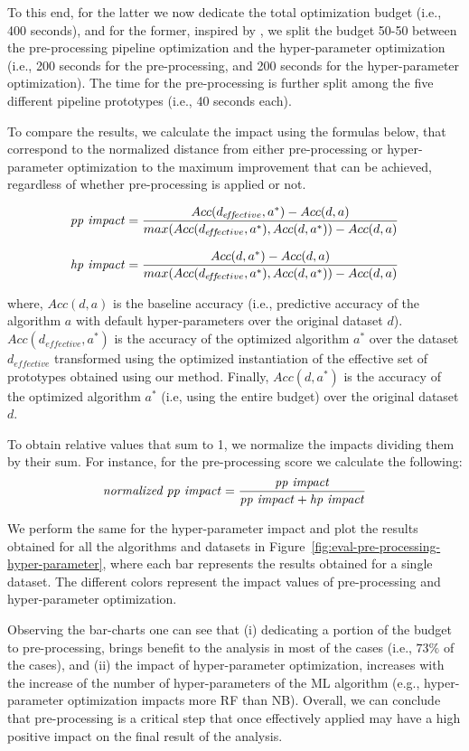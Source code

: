 To this end, for the latter we now dedicate the total optimization budget (i.e., 400 seconds), and for the former, inspired by \cite{Quemy20InfSystems}, we split the budget 50-50 between the pre-processing pipeline optimization and the hyper-parameter optimization (i.e., 200 seconds for the pre-processing, and 200 seconds for the hyper-parameter optimization). The time for the pre-processing is further split among the five different pipeline prototypes (i.e., 40 seconds each).

To compare the results, we calculate the impact using the formulas below, that correspond to the normalized distance from either pre-processing or hyper-parameter optimization to the maximum improvement that can be achieved, regardless of whether pre-processing is applied or not. 

\begin{equation*}
    \text{\textit{pp impact}} = \frac{Acc(d_{e\!f\!f\!ective},a^*) - Acc(d,a)}{max(Acc(d_{e\!f\!f\!ective},a^*),Acc(d,a^*)) - Acc(d,a)}
\end{equation*}

\begin{equation*}
    \text{\textit{hp impact}} = \frac{Acc(d,a^*) - Acc(d,a)}{max(Acc(d_{e\!f\!f\!ective},a^*),Acc(d,a^*)) - Acc(d,a)}
\end{equation*}

where, $Acc(d,a)$ is the baseline accuracy (i.e., predictive accuracy of the algorithm $a$ with default hyper-parameters over the original dataset $d$). $Acc(d_{e\!f\!f\!ective},a^*)$ is the accuracy of the optimized algorithm $a^*$ over the dataset $d_{e\!f\!f\!ective}$ transformed using the optimized instantiation of the effective set of prototypes obtained using our method. Finally,  $Acc(d,a^*)$ is the accuracy of the optimized algorithm $a^*$ (i.e, using the entire budget) over the original dataset $d$.

To obtain relative values that sum to 1, we normalize the impacts dividing them by their sum. For instance, for the pre-processing score we calculate the following:
\begin{equation*}
    \text{\textit{normalized pp impact}} = \frac{\text{\textit{pp impact}}}
    {\text{\textit{pp impact}} + \text{\textit{hp impact}}}
\end{equation*}


We perform the same for the hyper-parameter impact and plot the results obtained for all the algorithms and datasets in Figure~\ref{fig:eval-pre-processing-hyper-parameter}, where each bar represents the results obtained for a single dataset. The different colors represent the impact values of pre-processing and hyper-parameter optimization. 

Observing the bar-charts one can see that (i) dedicating a portion of the budget to pre-processing, brings benefit to the analysis in most of the cases (i.e., $73\%$ of the cases), and (ii) the impact of hyper-parameter optimization, increases with the increase of the number of hyper-parameters of the ML algorithm (e.g., hyper-parameter optimization impacts more RF than NB). Overall, we can conclude that pre-processing is a critical step that once effectively applied may have a high positive impact on the final result of the analysis.